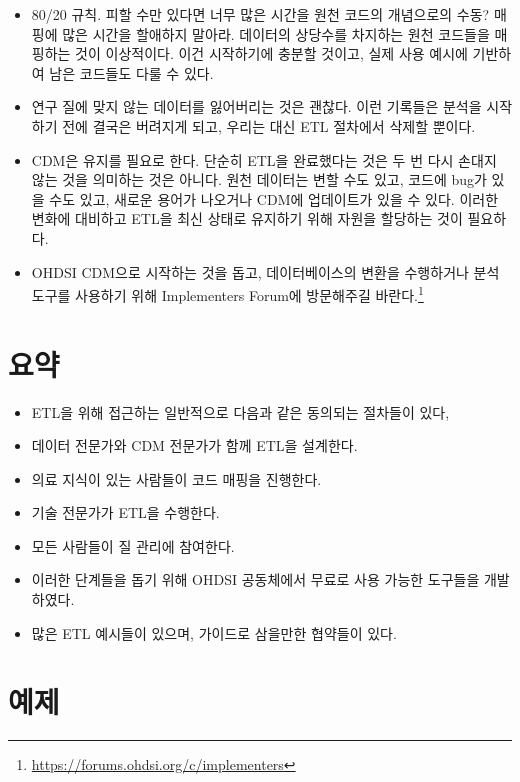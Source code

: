 \documentclass[11pt]{book}
\providecommand{\tightlist}{%
  \setlength{\itemsep}{0pt}\setlength{\parskip}{0pt}}
\let\rmarkdownfootnote\footnote%
\def\footnote{\protect\rmarkdownfootnote}
\theoremstyle{definition}
\theoremstyle{definition}
\theoremstyle{definition}
\theoremstyle{remark}
\let\BeginKnitrBlock\begin \let\EndKnitrBlock\end
\begin{document}
\begin{itemize}
\tightlist
\item
  80/20 규칙. 피할 수만 있다면 너무 많은 시간을 원천 코드의 개념으로의
  수동? 매핑에 많은 시간을 할애하지 말아라. 데이터의 상당수를 차지하는
  원천 코드들을 매핑하는 것이 이상적이다. 이건 시작하기에 충분할 것이고,
  실제 사용 예시에 기반하여 남은 코드들도 다룰 수 있다.
\item
  연구 질에 맞지 않는 데이터를 잃어버리는 것은 괜찮다. 이런 기록들은
  분석을 시작하기 전에 결국은 버려지게 되고, 우리는 대신 ETL 절차에서
  삭제할 뿐이다.
\item
  CDM은 유지를 필요로 한다. 단순히 ETL을 완료했다는 것은 두 번 다시
  손대지 않는 것을 의미하는 것은 아니다. 원천 데이터는 변할 수도 있고,
  코드에 bug가 있을 수도 있고, 새로운 용어가 나오거나 CDM에 업데이트가
  있을 수 있다. 이러한 변화에 대비하고 ETL을 최신 상태로 유지하기 위해
  자원을 할당하는 것이 필요하다.
\item
  OHDSI CDM으로 시작하는 것을 돕고, 데이터베이스의 변환을 수행하거나
  분석 도구를 사용하기 위해 Implementers Forum에 방문해주길
  바란다.\footnote{\url{https://forums.ohdsi.org/c/implementers}}
\end{itemize}

\section{요약}\label{-1}

\BeginKnitrBlock{rmdsummary}
\begin{itemize}
\item
  ETL을 위해 접근하는 일반적으로 다음과 같은 동의되는 절차들이 있다,
\item
  데이터 전문가와 CDM 전문가가 함께 ETL을 설계한다.
\item
  의료 지식이 있는 사람들이 코드 매핑을 진행한다.
\item
  기술 전문가가 ETL을 수행한다.
\item
  모든 사람들이 질 관리에 참여한다.
\item
  이러한 단계들을 돕기 위해 OHDSI 공동체에서 무료로 사용 가능한 도구들을
  개발하였다.
\item
  많은 ETL 예시들이 있으며, 가이드로 삼을만한 협약들이 있다.
\end{itemize}
\EndKnitrBlock{rmdsummary}

\section{예제}\label{-1}
\end{document}
